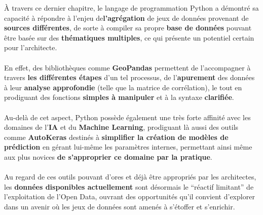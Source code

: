 \documentclass[
  11pt,
  french,
]{article}
\begin{document}
\newpage

À travers ce dernier chapitre, le langage de programmation Python a
démontré sa capacité à répondre à l'enjeu de\textbf{l'agrégation} de
jeux de données provenant de \textbf{sources différentes}, de sorte à
compiler sa propre \textbf{base de données} pouvant être basée sur des
\textbf{thématiques multiples}, ce qui présente un potentiel certain
pour l'architecte.\\
~\\
En effet, des bibliothèques comme \textbf{GeoPandas} permettent de
l'accompagner à travers \textbf{les différentes étapes} d'un tel
processus, de l'\textbf{apurement} des données à leur \textbf{analyse
approfondie} (telle que la matrice de corrélation), le tout en
prodiguant des fonctions \textbf{simples à manipuler} et à la syntaxe
\textbf{clarifiée}.\\
~\\
Au-delà de cet aspect, Python possède également une très forte affinité
avec les domaines de l'\textbf{IA} et du \textbf{Machine Learning},
prodiguant là aussi des outils comme \textbf{AutoKeras} destinés à
\textbf{simplifier la création de modèles de prédiction} en gérant
lui-même les paramètres internes, permettant ainsi même aux plus novices
\textbf{de s'approprier ce domaine par la pratique}.\\
~\\
Au regard de ces outils pouvant d'ores et déjà être appropriés par les
architectes, les \textbf{données disponibles actuellement} sont
désormais le ``réactif limitant'' de l'exploitation de l'Open Data,
ouvrant des opportunités qu'il convient d'explorer dans un avenir où les
jeux de données sont amenés à s'étoffer et s'enrichir.
\end{document}
